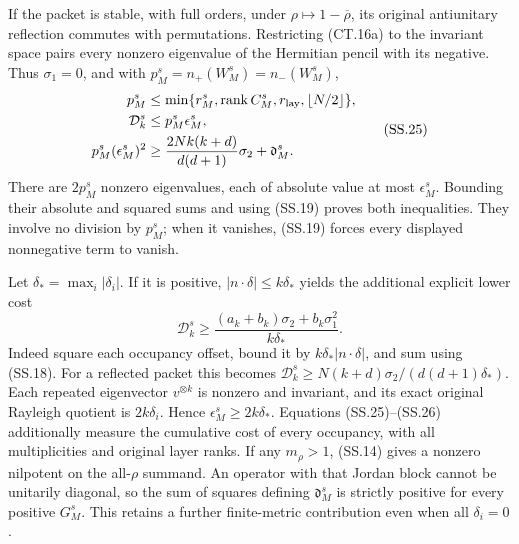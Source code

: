 If the packet is stable, with full orders, under
\(\rho\mapsto1-\overline\rho\), its original antiunitary
reflection commutes with permutations.  Restricting (CT.16a) to
the invariant space pairs every nonzero eigenvalue of the Hermitian
pencil with its negative.  Thus \(\sigma_1=0\), and with
\(p_M^s=n_+(W_M^s)=n_-(W_M^s)\),
\[
 \begin{split}
 p_M^s&\le\min\{r_M^s,\operatorname{rank}C_M^s,
                   r_{\rm lay},\lfloor N/2\rfloor\},\\
 \mathcal D_k^s&\le p_M^s\epsilon_M^s,\\
 p_M^s(\epsilon_M^s)^2
       &\ge\frac{2Nk(k+d)}{d(d+1)}\sigma_2
                                           +\mathfrak d_M^s.
 \end{split}                                                   \tag{SS.25}
\]
There are \(2p_M^s\) nonzero eigenvalues, each of absolute value
at most \(\epsilon_M^s\).  Bounding their absolute and squared
sums and using (SS.19) proves both inequalities.  They involve no
division by \(p_M^s\); when it vanishes, (SS.19) forces every
displayed nonnegative term to vanish.

Let \(\delta_* =\max_i|\delta_i|\).  If it is positive,
\(|n\cdot\delta|\le k\delta_*\) yields the additional
explicit lower cost
\[
 \mathcal D_k^s\ge
  \frac{(a_k+b_k)\sigma_2+b_k\sigma_1^2}{k\delta_*}.
                                                               \tag{SS.26}
\]
Indeed square each occupancy offset, bound it by
\(k\delta_*|n\cdot\delta|\), and sum using (SS.18).
For a reflected packet this becomes
\(\mathcal D_k^s\ge N(k+d)\sigma_2/(d(d+1)\delta_*)\).
Each repeated eigenvector \(v^{\otimes k}\) is nonzero and
invariant, and its exact original Rayleigh quotient is
\(2k\delta_i\).  Hence \(\epsilon_M^s\ge2k\delta_*\).
Equations (SS.25)--(SS.26) additionally measure the cumulative cost
of every occupancy, with all multiplicities and original layer ranks.
If any \(m_\rho>1\), (SS.14) gives a nonzero nilpotent on
the all-\(\rho\) summand.  An operator with that Jordan block
cannot be unitarily diagonal, so the sum of squares defining
\(\mathfrak d_M^s\) is strictly positive for every positive
\(G_M^s\).  This retains a further finite-metric contribution
even when all \(\delta_i=0\).

